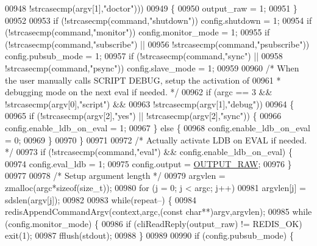 \begin{DoxyCode}
{{{{{{{{{{{{{{{{{{{{{{{{{{{00948                        !strcasecmp(argv[1],\textcolor{stringliteral}{"doctor"})))
00949     \{
00950         output\_raw = 1;
00951     \}
00952 
00953     \textcolor{keywordflow}{if} (!strcasecmp(command,\textcolor{stringliteral}{"shutdown"})) config.shutdown = 1;
00954     \textcolor{keywordflow}{if} (!strcasecmp(command,\textcolor{stringliteral}{"monitor"})) config.monitor\_mode = 1;
00955     \textcolor{keywordflow}{if} (!strcasecmp(command,\textcolor{stringliteral}{"subscribe"}) ||
00956         !strcasecmp(command,\textcolor{stringliteral}{"psubscribe"})) config.pubsub\_mode = 1;
00957     \textcolor{keywordflow}{if} (!strcasecmp(command,\textcolor{stringliteral}{"sync"}) ||
00958         !strcasecmp(command,\textcolor{stringliteral}{"psync"})) config.slave\_mode = 1;
00959 
00960     \textcolor{comment}{/* When the user manually calls SCRIPT DEBUG, setup the activation of}
00961 \textcolor{comment}{     * debugging mode on the next eval if needed. */}
00962     \textcolor{keywordflow}{if} (argc == 3 && !strcasecmp(argv[0],\textcolor{stringliteral}{"script"}) &&
00963                      !strcasecmp(argv[1],\textcolor{stringliteral}{"debug"}))
00964     \{
00965         \textcolor{keywordflow}{if} (!strcasecmp(argv[2],\textcolor{stringliteral}{"yes"}) || !strcasecmp(argv[2],\textcolor{stringliteral}{"sync"})) \{
00966             config.enable\_ldb\_on\_eval = 1;
00967         \} \textcolor{keywordflow}{else} \{
00968             config.enable\_ldb\_on\_eval = 0;
00969         \}
00970     \}
00971 
00972     \textcolor{comment}{/* Actually activate LDB on EVAL if needed. */}
00973     \textcolor{keywordflow}{if} (!strcasecmp(command,\textcolor{stringliteral}{"eval"}) && config.enable\_ldb\_on\_eval) \{
00974         config.eval\_ldb = 1;
00975         config.output = \hyperlink{redis-cli_8c_a4f47017b54da140967dcbd440fae227c}{OUTPUT\_RAW};
00976     \}
00977 
00978     \textcolor{comment}{/* Setup argument length */}
00979     argvlen = zmalloc(argc*\textcolor{keyword}{sizeof}(size\_t));
00980     \textcolor{keywordflow}{for} (j = 0; j < argc; j++)
00981         argvlen[j] = sdslen(argv[j]);
00982 
00983     \textcolor{keywordflow}{while}(repeat--) \{
00984         redisAppendCommandArgv(context,argc,(\textcolor{keyword}{const} \textcolor{keywordtype}{char}**)argv,argvlen);
00985         \textcolor{keywordflow}{while} (config.monitor\_mode) \{
00986             \textcolor{keywordflow}{if} (cliReadReply(output\_raw) != REDIS\_OK) exit(1);
00987             fflush(stdout);
00988         \}
00989 
00990         \textcolor{keywordflow}{if} (config.pubsub\_mode) \{
}}}}}}}}}}}}}}}}}}}}}}}}}}}
\end{DoxyCode}
